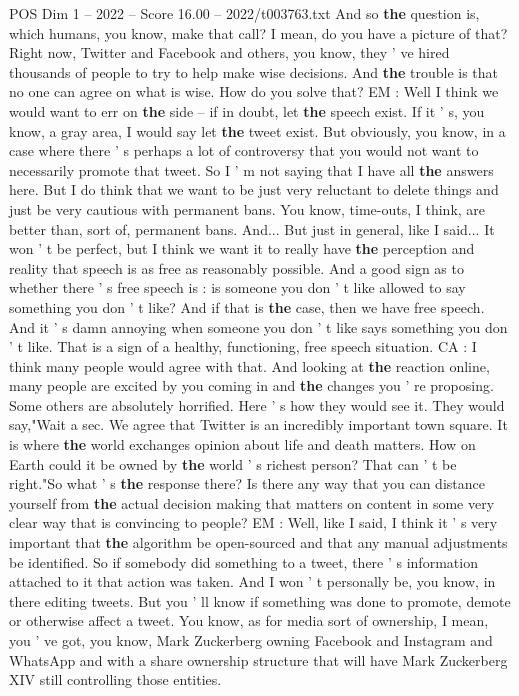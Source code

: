 \begin{textsample}{POS Dim 1 – 2022 – Score 16.00 – 2022/t003763.txt}
And so \textbf{the} question is, which humans, you know, make that call?
I mean, do you have a picture of that?
Right now, Twitter and Facebook and others, you know, they ' ve hired thousands of people to try to help make wise decisions.
And \textbf{the} trouble is that no one can agree on what is wise.
How do you solve that?
EM : Well I think we would want to err on \textbf{the} side -- if in doubt, let \textbf{the} speech exist.
If it ' s, you know, a gray area, I would say let \textbf{the} tweet exist.
But obviously, you know, in a case where there ' s perhaps a lot of controversy that you would not want to necessarily promote that tweet.
So I ' m not saying that I have all \textbf{the} answers here.
But I do think that we want to be just very reluctant to delete things and just be very cautious with permanent bans.
You know, time-outs, I think, are better than, sort of, permanent bans.
And...
But just in general, like I said...
It won ' t be perfect, but I think we want it to really have \textbf{the} perception and reality that speech is as free as reasonably possible.
And a good sign as to whether there ' s free speech is : is someone you don ' t like allowed to say something you don ' t like?
And if that is \textbf{the} case, then we have free speech.
And it ' s damn annoying when someone you don ' t like says something you don ' t like.
That is a sign of a healthy, functioning, free speech situation.
CA : I think many people would agree with that.
And looking at \textbf{the} reaction online, many people are excited by you coming in and \textbf{the} changes you ' re proposing.
Some others are absolutely horrified.
Here ' s how they would see it.
They would say,"Wait a sec.
We agree that Twitter is an incredibly important town square.
It is where \textbf{the} world exchanges opinion about life and death matters.
How on Earth could it be owned by \textbf{the} world ' s richest person?
That can ' t be right."So what ' s \textbf{the} response there?
Is there any way that you can distance yourself from \textbf{the} actual decision making that matters on content in some very clear way that is convincing to people?
EM : Well, like I said, I think it ' s very important that \textbf{the} algorithm be open-sourced and that any manual adjustments be identified.
So if somebody did something to a tweet, there ' s information attached to it that action was taken.
And I won ' t personally be, you know, in there editing tweets.
But you ' ll know if something was done to promote, demote or otherwise affect a tweet.
You know, as for media sort of ownership, I mean, you ' ve got, you know, Mark Zuckerberg owning Facebook and Instagram and WhatsApp and with a share ownership structure that will have Mark Zuckerberg XIV still controlling those entities.

\end{textsample}
